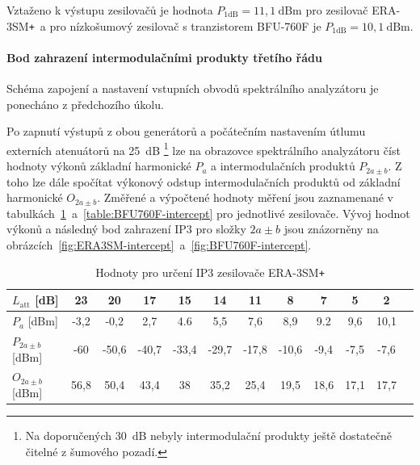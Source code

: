 \documentclass[11pt,a4paper]{article}
\newcommand{\plus}{{\texttt{+}}}
\begin{document}
Vztaženo k výstupu zesilovačů je hodnota $P_{1\mathrm{dB}} = 11,1~\mathrm{dBm}$ pro zesilovač ERA-3SM\plus~a pro nízkošumový zesilovač s tranzistorem BFU-760F je $P_{1\mathrm{dB}} = 10,1~\mathrm{dBm}$.

\paragraph*{Bod zahrazení intermodulačními produkty třetího řádu}
Schéma zapojení a nastavení vstupních obvodů spektrálního analyzátoru je ponecháno z předchozího úkolu.

Po zapnutí výstupů z obou generátorů a počátečním nastavením útlumu externích atenuátorů na 25~dB%
    \footnote{Na doporučených 30~dB nebyly intermodulační produkty ještě dostatečně čitelné z šumového pozadí.}
lze na obrazovce spektrálního analyzátoru číst hodnoty výkonů základní harmonické $P_a$ a intermodulačních produktů $P_{2a\pm b}$. Z toho lze dále spočítat výkonový odstup intermodulačních produktů od základní harmonické $O_{2a\pm b}$. Změřené a výpočtené hodnoty měření jsou zaznamenané v tabulkách~\ref{table:ERA3SM-intercept}~a~\ref{table:BFU760F-intercept} pro jednotlivé zesilovače. Vývoj hodnot výkonů a následný bod zahrazení IP3 pro složky $2a \pm b$ jsou znázorněny na obrázcích~\ref{fig:ERA3SM-intercept}~a~\ref{fig:BFU760F-intercept}.

\begin{table}[!ht]
\begin{center}
\begin{tabular}{| l || c | c | c | c | c | c | c | c | c | c | c |}
    \hline
    $L_{\mathrm{att}}$ [dB] & 23 & 20 & 17 & 15 & 14 & 11 & 8 & 7 & 5 & 2 \\
    \hline
    $P_a$ [dBm] & -3,2 & -0,2 & 2,7 & 4.6 & 5,5 & 7,6 & 8,9 & 9.2 & 9,6 & 10,1 \\
    \hline
    $P_{2a \pm b}$ [dBm] & -60 & -50,6 & -40,7 & -33,4 & -29,7 & -17,8 & -10,6 & -9,4 & -7,5 & -7,6 \\
    \hline\hline
    $O_{2a \pm b}$ [dBm] & 56,8 & 50,4 & 43,4 & 38 & 35,2 & 25,4 & 19,5 & 18,6 & 17,1 & 17,7 \\
    \hline
\end{tabular}
\caption{Hodnoty pro určení IP3 zesilovače ERA-3SM\plus}
\label{table:ERA3SM-intercept}
\end{center}
\end{table}
\end{document}
